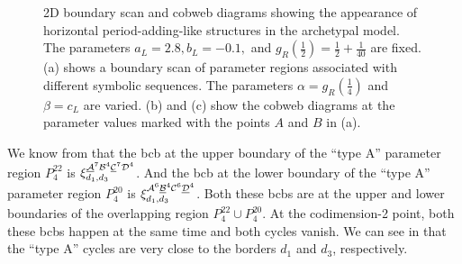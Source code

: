 \begin{figure}
	\centering
	\caption[2D boundary scan and cobweb diagrams showing the appearance of horizontal period-adding-like structures in the archetypal model]{
		2D boundary scan and cobweb diagrams showing the appearance of horizontal period-adding-like structures in the archetypal model.
		The parameters $a_L = 2.8, b_L = -0.1,$ and $g_R\left(\frac{1}{2}\right) = \frac{1}{2} + \frac{1}{40}$ are fixed.
		(a) shows a boundary scan of parameter regions associated with different symbolic sequences.
		The parameters $\alpha = g_R\left(\frac{1}{4}\right)$ and $\beta = c_L$ are varied.
		(b) and (c) show the cobweb diagrams at the parameter values marked with the points $A$ and $B$ in (a).
	}
\end{figure}

We know from  that the \gls{bcb} at the upper boundary of the ``type A'' parameter region $P^{22}_4$ is $\xi_{d_1, d_3}^{\underline{\mathcal{A}}^7\mathcal{B}^4\underline{\mathcal{C}}^7\mathcal{D}^4}$.
And the \gls{bcb} at the lower boundary of the ``type A'' parameter region $P^{20}_4$ is $\xi_{d_1, d_3}^{\mathcal{A}^6\underline{\mathcal{B}}^4\mathcal{C}^6\underline{\mathcal{D}}^4}$.
Both these \glspl{bcb} are at the upper and lower boundaries of the overlapping region $P^{22}_4 \cup P^{20}_4$.
At the codimension-2 point, both these \glspl{bcb} happen at the same time and both cycles vanish.
We can see in  that the ``type A'' cycles are very close to the borders $d_1$ and $d_3$, respectively.

